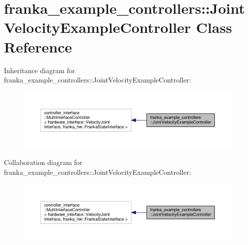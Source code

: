 \hypertarget{classfranka__example__controllers_1_1_joint_velocity_example_controller}{}\section{franka\+\_\+example\+\_\+controllers\+:\+:Joint\+Velocity\+Example\+Controller Class Reference}
\label{classfranka__example__controllers_1_1_joint_velocity_example_controller}


Inheritance diagram for franka\+\_\+example\+\_\+controllers\+:\+:Joint\+Velocity\+Example\+Controller\+:
\nopagebreak
\begin{figure}[H]
\begin{center}
\leavevmode
\includegraphics[width=350pt]{classfranka__example__controllers_1_1_joint_velocity_example_controller__inherit__graph}
\end{center}
\end{figure}


Collaboration diagram for franka\+\_\+example\+\_\+controllers\+:\+:Joint\+Velocity\+Example\+Controller\+:
\nopagebreak
\begin{figure}[H]
\begin{center}
\leavevmode
\includegraphics[width=350pt]{classfranka__example__controllers_1_1_joint_velocity_example_controller__coll__graph}
\end{center}
\end{figure}
